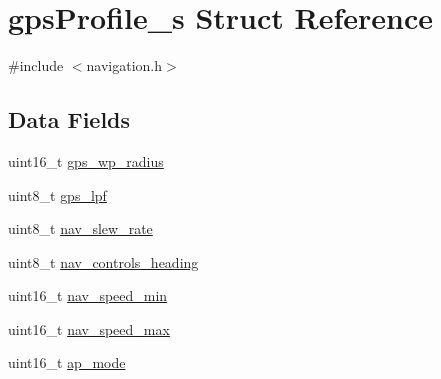 \hypertarget{structgpsProfile__s}{\section{gps\+Profile\+\_\+s Struct Reference}
\label{structgpsProfile__s}
}


{\ttfamily \#include $<$navigation.\+h$>$}

\subsection*{Data Fields}
\begin{DoxyCompactItemize}
\item 
uint16\+\_\+t \hyperlink{structgpsProfile__s_ae7f0087acbaa8041ebeb1d4fc1185468}{gps\+\_\+wp\+\_\+radius}
\item 
uint8\+\_\+t \hyperlink{structgpsProfile__s_a383ea6e3f307624f7ee2046beeb7b79e}{gps\+\_\+lpf}
\item 
uint8\+\_\+t \hyperlink{structgpsProfile__s_af86518e66d9ed148d7c3893d86e4e11f}{nav\+\_\+slew\+\_\+rate}
\item 
uint8\+\_\+t \hyperlink{structgpsProfile__s_ac8e53759a891c01d9e68294c8458411d}{nav\+\_\+controls\+\_\+heading}
\item 
uint16\+\_\+t \hyperlink{structgpsProfile__s_a87765f191812e7e526053ac687537d7e}{nav\+\_\+speed\+\_\+min}
\item 
uint16\+\_\+t \hyperlink{structgpsProfile__s_a08d6cd9904c42f41a117d025fdf5c9dc}{nav\+\_\+speed\+\_\+max}
\item 
uint16\+\_\+t \hyperlink{structgpsProfile__s_affedd769fe7355056583175bfb557429}{ap\+\_\+mode}
\end{DoxyCompactItemize}


